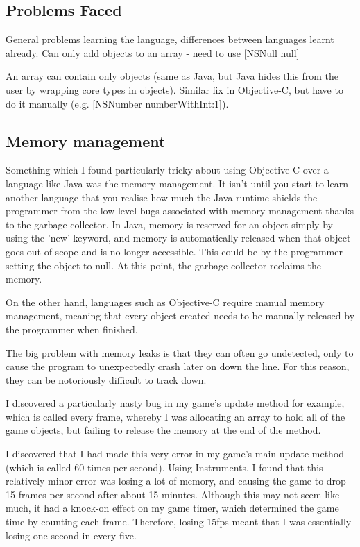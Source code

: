 \documentclass[a4paper,oneside]{report}
\begin{document}
\subsection{Problems Faced} General problems learning the language, differences between languages learnt already. Can only add objects to an array - need to use [NSNull null]

An array can contain only objects (same as Java, but Java hides this from the user by wrapping core types in objects). Similar fix in Objective-C, but have to do it manually (e.g. [NSNumber numberWithInt:1]).

\subsection{Memory management} Something which I found particularly tricky about using Objective-C over a language like Java was the memory management. It isn't until you start to learn another language that you realise how much the Java runtime shields the programmer from the low-level bugs associated with memory management thanks to the garbage collector. In Java, memory is reserved for an object simply by using the 'new' keyword, and memory is automatically released when that object goes out of scope and is no longer accessible. This could be by the programmer setting the object to null. At this point, the garbage collector reclaims the memory.

On the other hand, languages such as Objective-C  require manual memory management, meaning that every object created needs to be manually released by the programmer when finished. 

The big problem with memory leaks is that they can often go undetected, only to cause the program to unexpectedly crash later on down the line. For this reason, they can be notoriously difficult to track down. 

I discovered a particularly nasty bug in my game's update method for example, which is called every frame, whereby I was allocating an array to hold all of the game objects, but failing to release the memory at the end of the method. 

I discovered that I had made this very error in my game's main update method (which is called 60 times per second). Using Instruments, I found that this relatively minor error was losing a lot of memory, and causing the game to drop 15 frames per second after about 15 minutes. Although this may not seem like much, it had a knock-on effect on my game timer, which determined the game time by counting each frame. Therefore, losing 15fps meant that I was essentially losing one second in every five. 
\end{document}
